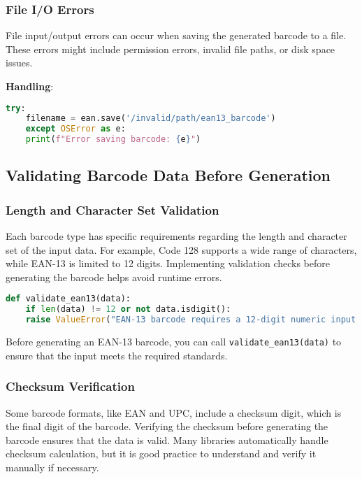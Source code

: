 \subsubsection{File I/O Errors}
File input/output errors can occur when saving the generated barcode to a file. These errors might include permission errors, invalid file paths, or disk space issues.

\textbf{Handling}:
\begin{lstlisting}[language=Python]
	try:
	filename = ean.save('/invalid/path/ean13_barcode')
	except OSError as e:
	print(f"Error saving barcode: {e}")
\end{lstlisting}



\subsection{Validating Barcode Data Before Generation}

\subsubsection{Length and Character Set Validation}
Each barcode type has specific requirements regarding the length and character set of the input data. For example, Code 128 supports a wide range of characters, while EAN-13 is limited to 12 digits. Implementing validation checks before generating the barcode helps avoid runtime errors.

\begin{lstlisting}[language=Python]
	def validate_ean13(data):
	if len(data) != 12 or not data.isdigit():
	raise ValueError("EAN-13 barcode requires a 12-digit numeric input.")
\end{lstlisting}

\noindent Before generating an EAN-13 barcode, you can call \texttt{validate\_ean13(data)} to ensure that the input meets the required standards.



\subsubsection{Checksum Verification}
Some barcode formats, like EAN and UPC, include a checksum digit, which is the final digit of the barcode. Verifying the checksum before generating the barcode ensures that the data is valid. Many libraries automatically handle checksum calculation, but it is good practice to understand and verify it manually if necessary.

